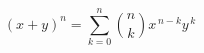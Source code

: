 \documentclass{article}
\begin{document}
\[
  (x + y)^{n} = \sum_{k=0}^{n} \binom{n}{k} x^{\,n-k} y^{\,k}
\]
\end{document}
